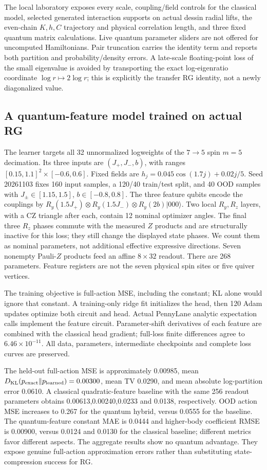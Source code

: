 \documentclass[11pt,oneside,openany]{book}
\theoremstyle{definition}\newtheorem{definition}[theorem]{Definition}
\theoremstyle{remark}\newtheorem{remark}[theorem]{Remark}
\begin{document}
The local laboratory exposes every scale, coupling/field controls for the
classical model, selected generated interaction supports on actual dessin
radial lifts, the even-chain $ K,h,C $ trajectory and physical correlation
length, and three fixed quantum matrix calculations. Live quantum parameter
sliders are not offered for uncomputed Hamiltonians. Pair truncation carries
the identity term and reports both partition and probability/density errors.
A late-scale floating-point loss of the small eigenvalue is avoided by
transporting the exact log-eigenratio coordinate $\log r\mapsto 2\log r $;
this is explicitly the transfer RG identity, not a newly diagonalized value.

\subsection{A quantum-feature model trained on actual RG}
The learner targets all 32 unnormalized logweights of the $7\to 5$ spin
$ m=5$ decimation. Its three inputs are $(J_+,J_-,b)$, with ranges
$[0.15,1.1]^2\times[-0.6,0.6]$. Fixed fields are
$ h_j=0.045\cos(1.7 j)+0.02 j/5$. Seed 20261103 fixes 160 input samples, a
120/40 train/test split, and 40 OOD samples with $ J_\pm\in[1.15,1.5]$,
$ b\in[-0.8,0.8]$. The three feature qubits encode the couplings by
$ R_y(1.5 J_+)\otimes R_y(1.5 J_-)\otimes R_y(2 b)|000\rangle $.
Two local $ R_y,R_z $ layers, with a CZ triangle after each, contain 12
nominal optimizer angles. The final three $ R_z $ phases commute with the
measured $ Z $ products and are structurally inactive for this loss; they
still change the displayed state phases. We count them as nominal
parameters, not additional effective expressive directions. Seven nonempty Pauli-$ Z $ products feed an affine
$8\times 32$ readout. There are 268 parameters. Feature registers are not
the seven physical spin sites or five quiver vertices.

The training objective is full-action MSE, including the constant; KL alone
would ignore that constant. A training-only ridge fit initializes the head,
then 120 Adam updates optimize both circuit and head. Actual PennyLane
analytic expectation calls implement the feature circuit. Parameter-shift
derivatives of each feature are combined with the classical head gradient;
full-loss finite differences agree to $6.46\times 10^{-11}$. All data,
parameters, intermediate checkpoints and complete loss curves are preserved.

The held-out full-action MSE is approximately 0.00985, mean
$ D_{\mathrm{KL}}(p_{\rm exact}\Vert p_{\rm learned})=0.00300$, mean TV 0.0290,
and mean absolute log-partition error 0.0610. A classical quadratic-feature
baseline with the same 256 readout parameters obtains 0.00613,0.00240,0.0233
and 0.0138, respectively. OOD action MSE increases to 0.267 for the quantum
hybrid, versus 0.0555 for the baseline. The quantum-feature constant MAE is 0.0444 and higher-body coefficient
RMSE is 0.00900, versus 0.0124 and 0.0130 for the classical baseline; different
metrics favor different aspects. The aggregate results show no quantum
advantage. They expose genuine full-action approximation errors rather
than substituting state-compression success for RG.
\end{document}
